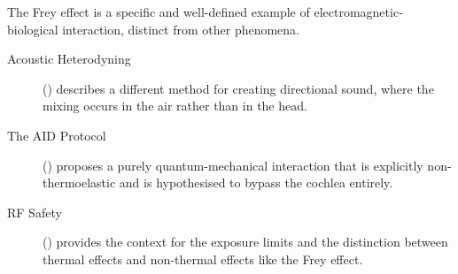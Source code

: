 \begin{importantbox}[title={Further Reading}]
    The Frey effect is a specific and well-defined example of electromagnetic-biological interaction, distinct from other phenomena.
    \begin{description}
        \item[Acoustic Heterodyning] () describes a different method for creating directional sound, where the mixing occurs in the air rather than in the head.
        \item[The AID Protocol] () proposes a purely quantum-mechanical interaction that is explicitly non-thermoelastic and is hypothesised to bypass the cochlea entirely.
        \item[RF Safety] () provides the context for the exposure limits and the distinction between thermal effects and non-thermal effects like the Frey effect.
    \end{description}
\end{importantbox}